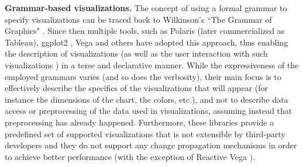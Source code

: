 
{\bf Grammar-based visualizations.} The concept of using a formal grammar to specify visualizations can be traced back to Wilkinson's ``The Grammar of Graphics" \cite{Wilkinson:2005:GG:1088896}. Since then multiple tools, such as Polaris \cite{stolte2002polaris} (later commercialized as Tableau), ggplot2 \cite{wickham2009ggplot2}, Vega \cite{satyanarayan2015vega, vega} and others \cite{ggvis, bostock2009protovis, d3} have adopted this approach, thus enabling the description of visualizations (as well as the user interaction with such visualizations \cite{Wu:2016:DAI:2939502.2939517, satyanarayan2016reactive}) in a terse and declarative manner. While the expressiveness of the employed grammars varies (and so does the verbosity), their main focus is to effectively describe the specifics of the visualizations that will appear (for instance the dimensions of the chart, the colors, etc.), and not to describe data access or preprocessing of the data used in visualizations, assuming instead that preprocessing has already happened. Furthermore, these libraries provide a predefined set of supported visualizations that is not extensible by third-party developers and they do not support any change propagation mechanisms in order to achieve better performance (with the exception of Reactive Vega \cite{satyanarayan2016reactive}).


